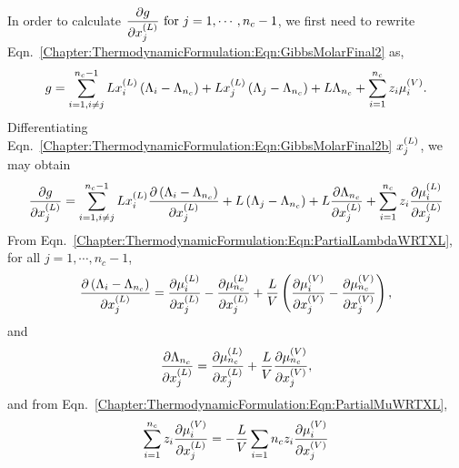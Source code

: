 \medskip


In order to calculate $\frc{\partial g}{\partial\mfr[x]{j}{L}}\text{ for } j=1, \cdots, n_{c}-1$, we first need to rewrite Eqn.~\ref{Chapter:ThermodynamicFormulation:Eqn:GibbsMolarFinal2} as,
\begin{equation}
   g = \summation_{i=1,\\ i\ne j}^{n_{c}-1} L\mfr[x]{i}{L}\left(\Lambda_{i}-\Lambda_{n_{c}}\right) + L\mfr[x]{j}{L}\left(\Lambda_{j}-\Lambda_{n_{c}}\right) + L\Lambda_{n_{c}} + \summation_{i=1}^{n_{c}} z_{i}\mfr[\mu]{i}{V}.\label{Chapter:ThermodynamicFormulation:Eqn:GibbsMolarFinal2b}
\end{equation}
Differentiating Eqn.~\ref{Chapter:ThermodynamicFormulation:Eqn:GibbsMolarFinal2b} \wrt $\mfr[x]{j}{L}$, we may obtain
\begin{equation}
   \frc{\partial g}{\partial\mfr[x]{j}{L}} = \summation_{i=1,\\ i\ne j}^{n_{c}-1} L\mfr[x]{i}{L}\frc{\partial\left(\Lambda_{i}-\Lambda_{n_{c}}\right)}{\partial\mfr[x]{j}{L}} + L\left(\Lambda_{j}-\Lambda_{n_{c}}\right) + L\frc{\partial\Lambda_{n_{c}}}{\partial\mfr[x]{j}{L}} + \summation_{i=1}^{n_{c}} z_{i}\frc{\partial\mfr[\mu]{i}{L}}{\partial\mfr[x]{j}{L}}\label{Chapter:ThermodynamicFormulation:Eqn:PartialGibbsMolarWRTXL}
\end{equation}
From Eqn.~\ref{Chapter:ThermodynamicFormulation:Eqn:PartialLambdaWRTXL}, for all $j=1, \cdots, n_{c}-1$,
\begin{displaymath}
    \frc{\partial\left(\Lambda_{i}-\Lambda_{n_{c}}\right)}{\partial\mfr[x]{j}{L}} = \frc{\partial\mfr[\mu]{i}{L}}{\partial\mfr[x]{j}{L}} - \frc{\partial\mfr[\mu]{n_{c}}{L}}{\partial\mfr[x]{j}{L}} + \frc{L}{V}\left(\frc{\partial\mfr[\mu]{i}{V}}{\partial\mfr[x]{j}{V}} - \frc{\partial\mfr[\mu]{n_{c}}{V}}{\partial\mfr[x]{j}{V}}\right),
\end{displaymath}
and 
\begin{displaymath}
    \frc{\partial\Lambda_{n_{c}}}{\partial\mfr[x]{j}{L}} = \frc{\partial\mfr[\mu]{n_{c}}{L}}{\partial\mfr[x]{j}{L}} + \frc{L}{V}\frc{\partial\mfr[\mu]{n_{c}}{V}}{\partial\mfr[x]{j}{V}},
\end{displaymath}
and from Eqn.~\ref{Chapter:ThermodynamicFormulation:Eqn:PartialMuWRTXL},
\begin{displaymath}
   \summation_{i=1}^{n_{c}} z_{i}\frc{\partial\mfr[\mu]{i}{V}}{\partial\mfr[x]{j}{L}} = -\frc{L}{V}\summation_{i=1}{n_{c}} z_{i}\frc{\partial\mfr[\mu]{i}{V}}{\partial\mfr[x]{j}{V}}
\end{displaymath}

